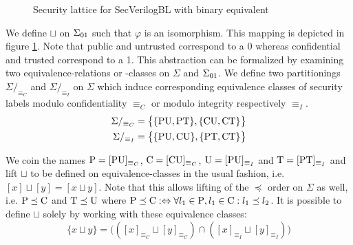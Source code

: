 \begin{figure}
    \centering
    \caption{Security lattice for SecVerilogBL \cite{Ferraiuolo17} with binary equivalent}
    \label{fig:sec-lattice-bin}
\end{figure}

We define $ \sqcup $ on $ \Sigma_{01} $ such that $ \varphi $ is an isomorphism.
This mapping is depicted in figure \ref{fig:sec-lattice-bin}.
Note that public and untrusted correspond to a 0 whereas confidential and trusted correspond to a 1.
This abstraction can be formalized by examining two equivalence-relations or -classes on $ \Sigma $ and $ \Sigma_{01} $.
We define two partitionings $ \Sigma/_{\equiv_C} $ and $ \Sigma/_{\equiv_I} $ on $ \Sigma $ which induce corresponding equivalence classes of security labels modulo confidentiality $ \equiv_C $ or modulo integrity respectively $ \equiv_I $.
\begin{align*}
    \Sigma /_{\equiv_C} &= \big\{ \{ \text{PU}, \text{PT} \}, \{ \text{CU}, \text{CT} \} \big\} \\
    \Sigma /_{\equiv_I} &= \big\{ \{ \text{PU}, \text{CU} \}, \{ \text{PT}, \text{CT} \} \big\}
\end{align*}

We coin the names $ \text{P} = [\text{PU}]_{\equiv_C} $, $ \text{C} = [\text{CU}]_{\equiv_C} $, $ \text{U} = [\text{PU}]_{\equiv_I} $ and $ \text{T} = [\text{PT}]_{\equiv_I} $ and lift $ \sqcup $ to be defined on equivalence-classes in the usual fashion, i.e. $ [x] \sqcup [y] = [x \sqcup y] $.
Note that this allows lifting of the $ \preceq $ order on $ \Sigma $ as well, i.e. $ \text{P} \preceq \text{C} $ and $ \text{T} \preceq \text{U} $ where $ \text{P} \preceq \text{C} :\Leftrightarrow \forall l_1 \in \text{P}, l_1 \in \text{C}: l_1 \preceq l_2 $.
It is possible to define $ \sqcup $ solely by working with these equivalence classes:
\begin{equation*}
    \{ x \sqcup y \} = \big(([x]_{\equiv_C} \sqcup [y]_{\equiv_C}) \cap ([x]_{\equiv_I} \sqcup [y]_{\equiv_I}) \big)
\end{equation*}

